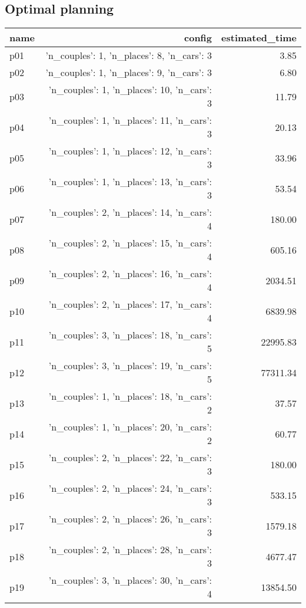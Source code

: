 \documentclass{article}
\begin{document}
                                \subsection*{Optimal planning}
                                
                            \begin{center}
                            \scriptsize
                            \begin{tabular}{@{}l|r|r@{}}
                            name & config & estimated\_time\\\midrule
                              p01&{'n\_couples': 1, 'n\_places': 8, 'n\_cars': 3}&3.85\\
  p02&{'n\_couples': 1, 'n\_places': 9, 'n\_cars': 3}&6.80\\
  p03&{'n\_couples': 1, 'n\_places': 10, 'n\_cars': 3}&11.79\\
  p04&{'n\_couples': 1, 'n\_places': 11, 'n\_cars': 3}&20.13\\
  p05&{'n\_couples': 1, 'n\_places': 12, 'n\_cars': 3}&33.96\\
  p06&{'n\_couples': 1, 'n\_places': 13, 'n\_cars': 3}&53.54\\
  p07&{'n\_couples': 2, 'n\_places': 14, 'n\_cars': 4}&180.00\\
  p08&{'n\_couples': 2, 'n\_places': 15, 'n\_cars': 4}&605.16\\
  p09&{'n\_couples': 2, 'n\_places': 16, 'n\_cars': 4}&2034.51\\
  p10&{'n\_couples': 2, 'n\_places': 17, 'n\_cars': 4}&6839.98\\
  p11&{'n\_couples': 3, 'n\_places': 18, 'n\_cars': 5}&22995.83\\
  p12&{'n\_couples': 3, 'n\_places': 19, 'n\_cars': 5}&77311.34\\
  p13&{'n\_couples': 1, 'n\_places': 18, 'n\_cars': 2}&37.57\\
  p14&{'n\_couples': 1, 'n\_places': 20, 'n\_cars': 2}&60.77\\
  p15&{'n\_couples': 2, 'n\_places': 22, 'n\_cars': 3}&180.00\\
  p16&{'n\_couples': 2, 'n\_places': 24, 'n\_cars': 3}&533.15\\
  p17&{'n\_couples': 2, 'n\_places': 26, 'n\_cars': 3}&1579.18\\
  p18&{'n\_couples': 2, 'n\_places': 28, 'n\_cars': 3}&4677.47\\
  p19&{'n\_couples': 3, 'n\_places': 30, 'n\_cars': 4}&13854.50\\

\end{tabular}
\end{center}
\end{document}
